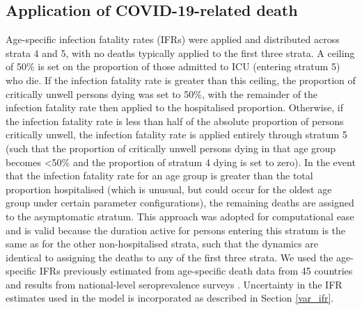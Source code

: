 \subsection{Application of COVID-19-related death}
Age-specific infection fatality rates (IFRs) were applied and distributed across strata 4 and 5, with no deaths typically applied to the first three strata. A ceiling of 50\% is set on the proportion of those admitted to ICU (entering stratum 5) who die. If the infection fatality rate is greater than this ceiling, the proportion of critically unwell persons dying was set to 50\%, with the remainder of the infection fatality rate then applied to the hospitalised proportion. Otherwise, if the infection fatality rate is less than half of the absolute proportion of persons critically unwell, the infection fatality rate is applied entirely through stratum 5 (such that the proportion of critically unwell persons dying in that age group becomes \textless 50\% and the proportion of stratum 4 dying is set to zero). In the event that the infection fatality rate for an age group is greater than the total proportion hospitalised (which is unusual, but could occur for the oldest age group under certain parameter configurations), the remaining deaths are assigned to the asymptomatic stratum. This approach was adopted for computational ease and is valid because the duration active for persons entering this stratum is the same as for the other non-hospitalised strata, such that the dynamics are identical to assigning the deaths to any of the first three strata. We used the age-specific IFRs previously estimated from age-specific death data from 45 countries and results from national-level seroprevalence surveys \cite{RN6}. Uncertainty in the IFR estimates used in the model is incorporated as described in Section \ref{var_ifr}.


